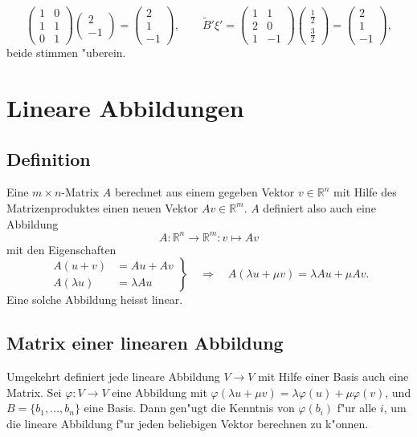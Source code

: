 \begin{beispiel}
\[\begin{pmatrix}
1&0\\
1&1\\
0&1
\end{pmatrix}
\begin{pmatrix}2\\-1\end{pmatrix}
=\begin{pmatrix} 2\\1\\-1 \end{pmatrix}
,\qquad
\tilde B' \xi'
=
\begin{pmatrix}
1& 1\\
2& 0\\
1&-1
\end{pmatrix}\begin{pmatrix}\frac12\\\frac32\end{pmatrix}
=\begin{pmatrix}2\\1\\-1 \end{pmatrix},
\]
beide stimmen "uberein.
\end{beispiel}

\section{Lineare Abbildungen}
\subsection{Definition}
Eine $m\times n$-Matrix $A$ berechnet aus einem gegeben Vektor
$v\in\mathbb R^n$ mit Hilfe des
Matrizenproduktes einen neuen Vektor $Av\in\mathbb R^m$. $A$ definiert also
auch eine Abbildung
\[
A\colon\mathbb R^n\to\mathbb R^m:v\mapsto Av
\]
mit den Eigenschaften
\[
\left.
\begin{aligned}
A(u+v)&=Au+Av\\
A(\lambda u)&=\lambda Au
\end{aligned}\right\}\quad
\Rightarrow\quad
A(\lambda u+\mu v)=\lambda Au+\mu Av.
\]
Eine solche Abbildung heisst linear.

\subsection{Matrix einer linearen Abbildung}
Umgekehrt definiert jede lineare Abbildung $V\to V$ mit Hilfe einer
Basis auch eine Matrix. Sei $\varphi\colon V\to V$ eine Abbildung
mit $\varphi(\lambda u+\mu v)=\lambda \varphi(u)+\mu\varphi(v)$,
und $B=\{b_1,\dots,b_n\}$ eine Basis. Dann gen"ugt die Kenntnis
von $\varphi(b_i)$ f"ur alle $i$, um die lineare Abbildung f"ur
jeden beliebigen Vektor berechnen zu k"onnen.

